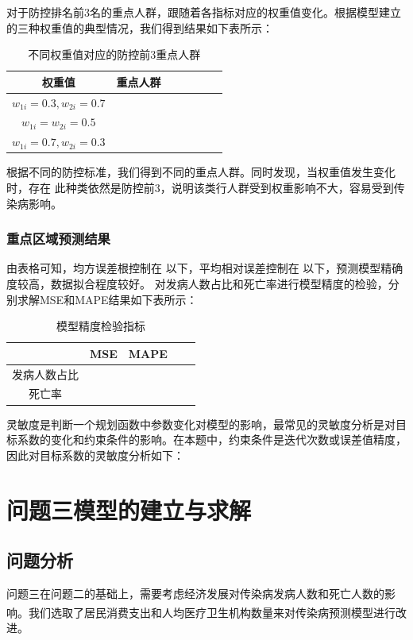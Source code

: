 \documentclass{whutmod}
\begin{document}
对于防控排名前3名的重点人群，跟随着各指标对应的权重值变化。根据模型建立的三种权重值的典型情况，我们得到结果如下表所示：
\begin{table}[H]
    \caption{不同权重值对应的防控前3重点人群} \centering 
    \begin{tabular*}{13cm}{ccccccc}
        \toprule[1.5pt]
        权重值 & 重点人群 \\
        \midrule[1pt]
        $w_{1i}=0.3,w_{2i}=0.7$ &  \\
        $w_{1i}=w_{2i}=0.5$ &  \\
        $w_{1i}=0.7,w_{2i}=0.3$ & \\
        \bottomrule[1.5pt]
    \end{tabular*}
\end{table}
根据不同的防控标准，我们得到不同的重点人群。同时发现，当权重值发生变化时，存在 此种类依然是防控前3，说明该类行人群受到权重影响不大，容易受到传染病影响。

\subsubsection{重点区域预测结果} 
由表格可知，均方误差根控制在 以下，平均相对误差控制在 以下，预测模型精确度较高，数据拟合程度较好。
对发病人数占比和死亡率进行模型精度的检验，分别求解MSE和MAPE结果如下表所示：
\begin{table}[H]
    \caption{模型精度检验指标} \centering 
    \begin{tabular*}{8cm}{ccccc}
        \toprule[1.5pt]
         & MSE & MAPE \\
         \midrule[1pt]
         发病人数占比 &  &  \\
         死亡率 & & \\
         \bottomrule[1.5pt]
    \end{tabular*}
\end{table}
灵敏度是判断一个规划函数中参数变化对模型的影响，最常见的灵敏度分析是对目标系数的变化和约束条件的影响。在本题中，约束条件是迭代次数或误差值精度，因此对目标系数的灵敏度分析如下：

\section{问题三模型的建立与求解}
\subsection{问题分析}
问题三在问题二的基础上，需要考虑经济发展对传染病发病人数和死亡人数的影响。我们选取了居民消费支出和人均医疗卫生机构数量\textsuperscript{\cite{bib:eleven}}来对传染病预测模型进行改进。
\end{document}
